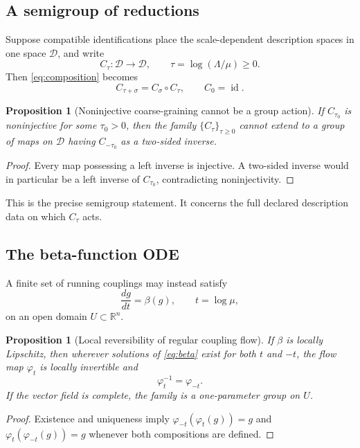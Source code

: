 \documentclass[11pt]{article}
\newtheorem{proposition}[theorem]{Proposition}
\theoremstyle{definition}
\theoremstyle{remark}
\newcommand{\id}{\operatorname{id}}
\newcommand{\R}{\mathbb{R}}
\begin{document}
\subsection{A semigroup of reductions}

Suppose compatible identifications place the scale-dependent description
spaces in one space \(\mathcal D\), and write
\[
 C_\tau:\mathcal D\to\mathcal D,
 \qquad
 \tau=\log(\Lambda/\mu)\geq0.
\]
Then \cref{eq:composition} becomes
\[
 C_{\tau+\sigma}=C_\sigma\circ C_\tau,
 \qquad
 C_0=\id.
\]

\begin{proposition}[Noninjective coarse-graining cannot be a group action]
\label{prop:semigroup}
If \(C_{\tau_0}\) is noninjective for some \(\tau_0>0\), then the family
\(\{C_\tau\}_{\tau\geq0}\) cannot extend to a group of maps on
\(\mathcal D\) having \(C_{-\tau_0}\) as a two-sided inverse.
\end{proposition}

\begin{proof}
Every map possessing a left inverse is injective.  A two-sided inverse would
in particular be a left inverse of \(C_{\tau_0}\), contradicting
noninjectivity.
\end{proof}

This is the precise semigroup statement.  It concerns the full declared
description data on which \(C_\tau\) acts.

\subsection{The beta-function ODE}

A finite set of running couplings may instead satisfy
\begin{equation}
 \frac{d g}{dt}=\beta(g),
 \qquad
 t=\log\mu,
\label{eq:beta}
\end{equation}
on an open domain \(U\subset\R^n\).

\begin{proposition}[Local reversibility of regular coupling flow]
\label{prop:ode}
If \(\beta\) is locally Lipschitz, then wherever solutions of
\cref{eq:beta} exist for both \(t\) and \(-t\), the flow map
\(\varphi_t\) is locally invertible and
\[
 \varphi_t^{-1}=\varphi_{-t}.
\]
If the vector field is complete, the family is a one-parameter group on
\(U\).
\end{proposition}

\begin{proof}
Existence and uniqueness imply
\(\varphi_{-t}(\varphi_t(g))=g\) and
\(\varphi_t(\varphi_{-t}(g))=g\) whenever both compositions are defined.
\end{proof}
\end{document}
